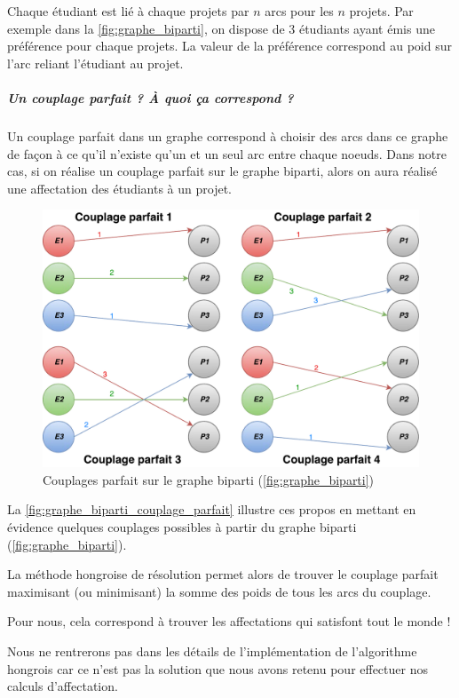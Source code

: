 \documentclass{polytech/polytech}
\begin{document}
Chaque étudiant est lié à chaque projets par $n$ arcs pour les $n$ projets. Par exemple dans la \autoref{fig:graphe_biparti}, on dispose de 3 étudiants ayant émis une préférence pour chaque projets. La valeur de la préférence correspond au poid sur l'arc reliant l'étudiant au projet.

\subparagraph{Un couplage parfait ? \`A quoi ça correspond ?}

Un couplage parfait dans un graphe correspond à choisir des arcs dans ce graphe de façon à ce qu'il n'existe qu'un et un seul arc entre chaque noeuds.
Dans notre cas, si on réalise un couplage parfait sur le graphe biparti, alors on aura réalisé une affectation des étudiants à un projet. 

\begin{figure}[htbp]
\includegraphics[width=12cm]{images/graphe_biparti_couplage_parfait}
\caption{\label{fig:graphe_biparti_couplage_parfait}Couplages parfait sur le graphe biparti (\autoref{fig:graphe_biparti})}
\end{figure}

La \autoref{fig:graphe_biparti_couplage_parfait} illustre ces propos en mettant en évidence quelques couplages possibles à partir du graphe biparti (\autoref{fig:graphe_biparti}).

La méthode hongroise de résolution permet alors de trouver le couplage parfait maximisant (ou minimisant) la somme des poids de tous les arcs du couplage.

Pour nous, cela correspond à trouver les affectations qui satisfont tout le monde ! 

Nous ne rentrerons pas dans les détails de l'implémentation de l'algorithme hongrois car ce n'est pas la solution que nous avons retenu pour effectuer nos calculs d'affectation. 
\end{document}
